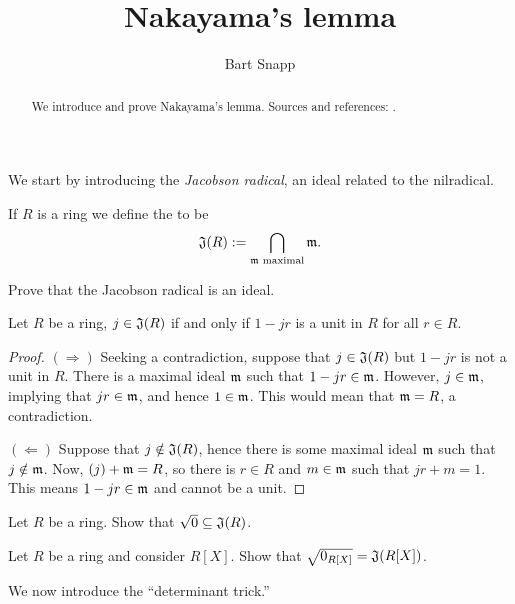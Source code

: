 \documentclass{ximera}
\author{Bart Snapp}
\title{Nakayama's lemma}
\begin{document}
\begin{abstract}
  We introduce and prove Nakayama's lemma. Sources and references:
  \cite{AM1969,jpS2000}.
\end{abstract}
\maketitle

We start by introducing the \textit{Jacobson radical}, an ideal related to the nilradical.

\begin{definition}
  If $R$ is a ring we define the  to be
  \[
  \mathfrak J(R) := \bigcap_{\mathfrak{m} \text{ maximal}}\mathfrak{m}.
  \]
\end{definition}

\begin{exercise}
  Prove that the Jacobson radical is an ideal.
\end{exercise}

\begin{proposition}\label{P:CharJR}
  Let $R$ be a ring, $j\in\mathfrak J(R)$ if and only if $1-jr$ is a unit in
  $R$ for all $r\in R$.
  \begin{proof}
    $(\Rightarrow)$ Seeking a contradiction, suppose that $j\in \mathfrak
    J(R)$ but $1-jr$ is not a unit in $R$. There is a maximal ideal
    $\mathfrak{m}$ such that $1-jr\in\mathfrak{m}$. However, $j\in\mathfrak{m}$, implying that
    $jr\in\mathfrak{m}$, and hence $1\in\mathfrak{m}$. This would mean that $\mathfrak{m} = R$, a
    contradiction.

    $(\Leftarrow)$ Suppose that $j\notin\mathfrak J(R)$, hence there is some
    maximal ideal $\mathfrak{m}$ such that $j\notin\mathfrak{m}$. Now, $(j)+\mathfrak{m} = R$, so
    there is $r\in R$ and $m\in\mathfrak{m}$ such that $jr+m = 1$. This means
    $1-jr\in\mathfrak{m}$ and cannot be a unit.
  \end{proof}
\end{proposition}

\begin{exercise}
  Let $R$ be a ring. Show that $\sqrt{0}\subseteq \mathfrak J(R)$.
\end{exercise}

\begin{exercise}
  Let $R$ be a ring and consider $R[X]$. Show that $\sqrt{0_{R[X]}} =
  \mathfrak J(R[X])$.
\end{exercise}





We now introduce the ``determinant trick.''
\end{document}
